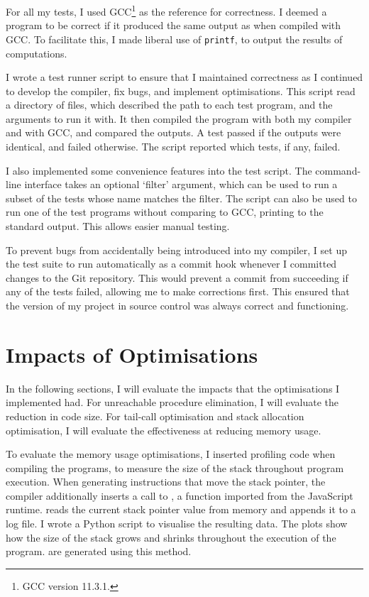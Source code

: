 \documentclass[00-main.tex]{subfiles}
\begin{document}
For all my tests, I used GCC\footnote{GCC version 11.3.1.} as the reference for correctness.
I deemed a program to be correct if it produced the same output as when compiled with GCC\@.
To facilitate this, I made liberal use of \texttt{printf}, to output the results of computations.

I wrote a test runner script to ensure that I maintained correctness as I continued to develop the compiler, fix bugs, and implement optimisations.
This script read a directory of  files, which described the path to each test program, and the arguments to run it with.
It then compiled the program with both my compiler and with GCC, and compared the outputs.
A test passed if the outputs were identical, and failed otherwise.
The script reported which tests, if any, failed.

I also implemented some convenience features into the test script.
The command-line interface takes an optional `filter' argument, which can be used to run a subset of the tests whose name matches the filter.
The script can also be used to run one of the test programs without comparing to GCC, printing to the standard output. This allows easier manual testing.

To prevent bugs from accidentally being introduced into my compiler, I set up the test suite to run automatically as a commit hook whenever I committed changes to the Git repository.
This would prevent a commit from succeeding if any of the tests failed, allowing me to make corrections first.
This ensured that the version of my project in source control was always correct and functioning.




\section{Impacts of Optimisations}\label{sec:eval:optimisations}

In the following sections, I will evaluate the impacts that the optimisations I implemented had.
For unreachable procedure elimination, I will evaluate the reduction in code size.
For tail-call optimisation and stack allocation optimisation, I will evaluate the effectiveness at reducing memory usage.

To evaluate the memory usage optimisations, I inserted profiling code when compiling the programs, to measure the size of the stack throughout program execution.
When generating instructions that move the stack pointer, the compiler additionally inserts a call to , a function imported from the JavaScript runtime.
 reads the current stack pointer value from memory and appends it to a log file.
I wrote a Python script to visualise the resulting data.
The plots show how the size of the stack grows and shrinks throughout the execution of the program.
 are generated using this method.
\end{document}
